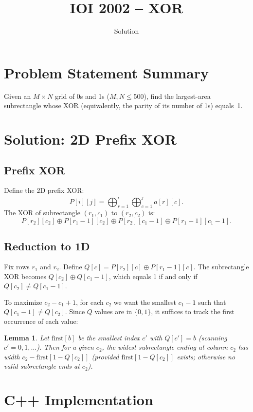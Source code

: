 \documentclass[11pt,a4paper]{article}
\title{IOI 2002 -- XOR}
\author{Solution}
\date{}
\newtheorem{lemma}[theorem]{Lemma}
\begin{document}
\maketitle

\section{Problem Statement Summary}
Given an $M \times N$ grid of 0s and 1s ($M, N \le 500$), find the
largest-area subrectangle whose XOR (equivalently, the parity of its
number of 1s) equals~1.

\section{Solution: 2D Prefix XOR}

\subsection{Prefix XOR}
Define the 2D prefix XOR:
\[
  P[i][j] = \bigoplus_{r=1}^{i}\bigoplus_{c=1}^{j} a[r][c].
\]
The XOR of subrectangle $(r_1, c_1)$ to $(r_2, c_2)$ is:
\[
  P[r_2][c_2] \oplus P[r_1{-}1][c_2]
  \oplus P[r_2][c_1{-}1] \oplus P[r_1{-}1][c_1{-}1].
\]

\subsection{Reduction to 1D}
Fix rows $r_1$ and $r_2$. Define
$Q[c] = P[r_2][c] \oplus P[r_1{-}1][c]$.
The subrectangle XOR becomes $Q[c_2] \oplus Q[c_1{-}1]$, which
equals 1 if and only if $Q[c_2] \ne Q[c_1{-}1]$.

To maximize $c_2 - c_1 + 1$, for each $c_2$ we want the smallest
$c_1{-}1$ such that $Q[c_1{-}1] \ne Q[c_2]$. Since $Q$ values are
in $\{0, 1\}$, it suffices to track the first occurrence of each value:

\begin{lemma}
Let $\mathrm{first}[b]$ be the smallest index $c'$ with $Q[c'] = b$
(scanning $c' = 0, 1, \ldots$). Then for a given $c_2$, the widest
subrectangle ending at column $c_2$ has width
$c_2 - \mathrm{first}[1 - Q[c_2]]$ (provided $\mathrm{first}[1 - Q[c_2]]$
exists; otherwise no valid subrectangle ends at $c_2$).
\end{lemma}

\section{C++ Implementation}
\end{document}
